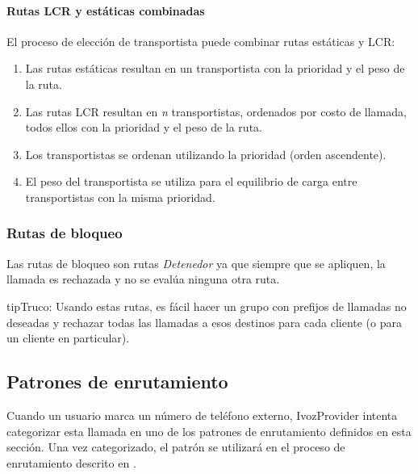 \documentclass[letterpaper,10pt,spanish]{sphinxmanual}
\begin{document}
\paragraph{Rutas LCR y estáticas combinadas}
\label{administration_portal/brand/routing/outgoing_routings:lcr-and-static-routes-combined}
El proceso de elección de transportista puede combinar rutas estáticas y LCR:
\begin{enumerate}
\item {} 
Las rutas estáticas resultan en un transportista con la prioridad y el peso de la ruta.

\item {} 
Las rutas LCR resultan en \emph{n} transportistas, ordenados por costo de llamada, todos ellos con la prioridad y el peso de la ruta.

\item {} 
Los transportistas se ordenan utilizando la prioridad (orden ascendente).

\item {} 
El peso del transportista se utiliza para el equilibrio de carga entre transportistas con la misma prioridad.

\end{enumerate}


\subsubsection{Rutas de bloqueo}
\label{administration_portal/brand/routing/outgoing_routings:blocking-routes}
Las rutas de bloqueo son rutas \emph{Detenedor} ya que siempre que se apliquen, la llamada es rechazada y no se evalúa ninguna otra ruta.

\begin{notice}{tip}{Truco:}
Usando estas rutas, es fácil hacer un grupo con prefijos de llamadas no deseadas y rechazar todas las llamadas a esos destinos para cada cliente (o para un cliente en particular).
\end{notice}
\label{administration_portal/brand/routing/routing_patterns:routing-patterns}

\subsection{Patrones de enrutamiento}
\label{administration_portal/brand/routing/routing_patterns:id2}\label{administration_portal/brand/routing/routing_patterns::doc}\label{administration_portal/brand/routing/routing_patterns:routing-patterns}\label{administration_portal/brand/routing/routing_patterns:id1}
Cuando un usuario marca un número de teléfono externo, IvozProvider intenta categorizar esta llamada en uno de los patrones de enrutamiento definidos en esta sección. Una vez categorizado, el patrón se utilizará en el proceso de enrutamiento descrito en {\hyperref[administration_portal/brand/routing/outgoing_routings:outgoing\string-routings]{}}.
\end{document}
